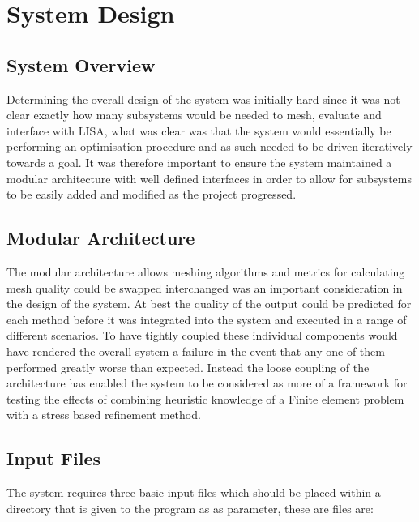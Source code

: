 \documentclass{article}
\begin{document}
\section{System Design}


\subsection{System Overview}
Determining the overall design of the system was initially hard since it was not clear exactly how many subsystems would be needed to mesh, evaluate and interface with LISA, what was clear was that the system would essentially be performing an optimisation procedure and as such needed to be driven iteratively towards a goal. It was therefore important to ensure the system maintained a modular architecture with well defined interfaces in order to allow for subsystems to be easily added and modified as the project progressed.


\subsection{Modular Architecture}
The modular architecture allows meshing algorithms and metrics for calculating mesh quality could be swapped interchanged was an important consideration in the design of the system. At best the quality of the output could be predicted for each method before it was integrated into the system and executed in a range of different scenarios. To have tightly coupled these individual components would have rendered the overall system a failure in the event that any one of them performed greatly worse than expected. Instead the loose coupling of the architecture has enabled the system to be considered as more of a framework for testing the effects of combining heuristic knowledge of a Finite element problem with a stress based refinement method.



\subsection{Input Files}
The system requires three basic input files which should be placed within a directory that is given to the program as as parameter, these are files are:
\end{document}
